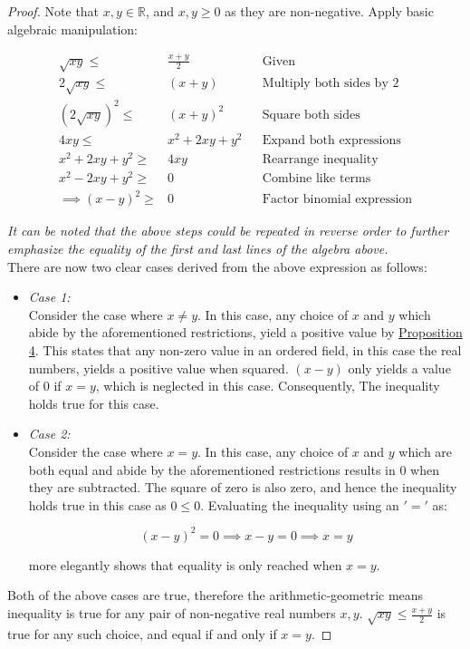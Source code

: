 \documentclass[12pt]{article}
\begin{document}
\begin{proof}
Note that $x,y\in\mathbb{R}$, and $x,y\ge 0$ as they are non-negative. Apply basic algebraic manipulation:

\begin{align*}
\sqrt{xy} \le& \frac{x+y}{2} && \text{Given} \\
2\sqrt{xy} \le& (x+y) && \text{Multiply both sides by 2} \\
(2\sqrt{xy})^2 \le& (x+y)^2 && \text{Square both sides} \\
4xy \le& x^2 + 2xy + y^2 && \text{Expand both expressions} \\
x^2 + 2xy + y^2 \ge& 4xy && \text{Rearrange inequality} \\
x^2 - 2xy + y^2 \ge& 0 && \text{Combine like terms} \\
\implies (x-y)^2 \ge& 0 && \text{Factor binomial expression}
\end{align*}

\noindent \textit{It can be noted that the above steps could be repeated in reverse order to further emphasize the equality of the first and last lines of the algebra above.} \\

\noindent There are now two clear cases derived from the above expression as follows:

\begin{itemize}
\item \textit{Case 1:} \\
Consider the case where $x\neq y$. In this case, any choice of $x$ and $y$ which abide by the aforementioned restrictions, yield a positive value by \underline{Proposition 4}. This states that any non-zero value in an ordered field, in this case the real numbers, yields a positive value when squared. $(x-y)$ only yields a value of 0 if $x=y$, which is neglected in this case. Consequently, The inequality holds true for this case.

\item \textit{Case 2:} \\
Consider the case where $x=y$. In this case, any choice of $x$ and $y$ which are both equal and abide by the aforementioned restrictions results in $0$ when they are subtracted. The square of zero is also zero, and hence the inequality holds true in this case as $0 \le 0$. Evaluating the inequality using an $'='$ as:

\begin{equation*}
(x-y)^2=0\implies x-y=0\implies x=y
\end{equation*}

more elegantly shows that equality is only reached when $x=y$.
\end{itemize}

\noindent Both of the above cases are true, therefore the arithmetic-geometric means inequality is true for any pair of non-negative real numbers $x, y$. $\sqrt{xy} \le \frac{x+y}{2}$ is true for any such choice, and equal if and only if $x=y$.
\end{proof}
\end{document}
